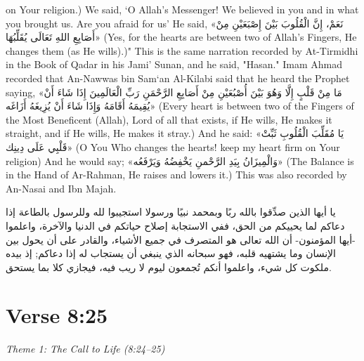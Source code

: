 \documentclass[11pt,a4paper,openany]{book}
\let\textAR\textarabic
\begin{document}
\begin{tafsirbox}
on Your religion.) We said, `O Allah's Messenger! We believed in you and in what you brought us. Are you afraid for us' He said, \textAR{«نَعَمْ،} \textAR{إِنَّ} \textAR{الْقُلُوبَ} \textAR{بَيْنَ} \textAR{إِصْبَعَيْنِ} \textAR{مِنْ} \textAR{أَصَابِعِ} \textAR{اللهِ} \textAR{تَعَالَى} \textAR{يُقَلِّبُهَا»} (Yes, for the hearts are between two of Allah's Fingers, He changes them (as He wills).)" This is the same narration recorded by At-Tirmidhi in the Book of Qadar in his Jami' Sunan, and he said, "Hasan." Imam Ahmad recorded that An-Nawwas bin Sam`an Al-Kilabi said that he heard the Prophet saying, \textAR{«مَا} \textAR{مِنْ} \textAR{قَلْبٍ} \textAR{إِلَّا} \textAR{وَهُوَ} \textAR{بَيْنَ} \textAR{أُصْبُعَيْنِ} \textAR{مِنْ} \textAR{أَصَابِعِ} \textAR{الرَّحْمَنِ} \textAR{رَبِّ} \textAR{الْعَالَمِينَ} \textAR{إِذَا} \textAR{شَاءَ} \textAR{أَنْ} \textAR{يُقِيمَهُ} \textAR{أَقَامَهُ} \textAR{وَإِذَا} \textAR{شَاءَ} \textAR{أَنْ} \textAR{يُزِيغَهُ} \textAR{أَزَاغَه»} (Every heart is between two of the Fingers of the Most Beneficent (Allah), Lord of all that exists, if He wills, He makes it straight, and if He wills, He makes it stray.) And he said: \textAR{«يَا} \textAR{مُقَلِّبَ} \textAR{الْقُلُوبِ} \textAR{ثَبِّتْ} \textAR{قَلْبِي} \textAR{عَلَى} \textAR{دِينِك»} (O You Who changes the hearts! keep my heart firm on Your religion) And he would say; \textAR{«وَالْمِيزَانُ} \textAR{بِيَدِ} \textAR{الرَّحْمنِ} \textAR{يَخْفِضُهُ} \textAR{وَيَرْفَعُه»} (The Balance is in the Hand of Ar-Rahman, He raises and lowers it.) This was also recorded by An-Nasai and Ibn Majah.
\end{tafsirbox}


\begin{muyassarbox}
\textAR{يا أيها الذين صدِّقوا بالله ربًا وبمحمد نبيًا ورسولا استجيبوا لله وللرسول بالطاعة إذا دعاكم لما يحييكم من الحق، ففي الاستجابة إصلاح حياتكم في الدنيا والآخرة، واعلموا -أيها المؤمنون- أن الله تعالى هو المتصرف في جميع الأشياء، والقادر على أن يحول بين الإنسان وما يشتهيه قلبه، فهو سبحانه الذي ينبغي أن يستجاب له إذا دعاكم; إذ بيده ملكوت كل شيء، واعلموا أنكم تُجمعون ليوم لا ريب فيه، فيجازي كلا بما يستحق.}
\end{muyassarbox}


\newpage

\section{Verse 8:25}
{\small\color{accent2}\itshape Theme 1: The Call to Life (8:24--25)}
\end{document}
